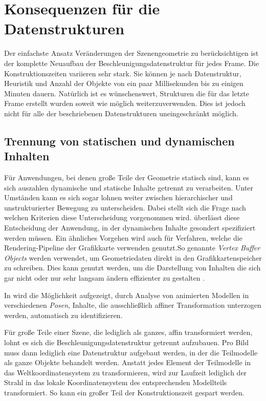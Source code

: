 \section{Konsequenzen für die Datenstrukturen}

Der einfachste Ansatz Veränderungen der Szenengeometrie zu berücksichtigen ist der komplette Neuaufbau der Beschleunigungsdatenstruktur für jedes Frame. Die Konstruktionszeiten variieren sehr stark. Sie können je nach Datenstruktur, Heuristik und Anzahl der Objekte von ein paar Millisekunden bis zu einigen Minuten dauern.
Natürlich ist es wünschenswert, Strukturen die für das letzte Frame erstellt wurden soweit wie möglich weiterzuverwenden. Dies ist jedoch nicht für alle der beschriebenen Datenstrukturen uneingeschränkt möglich.


\subsection{Trennung von statischen und dynamischen Inhalten}

Für Anwendungen, bei denen große Teile der Geometrie statisch sind, kann es sich auszahlen dynamische und statische Inhalte getrennt zu verarbeiten. Unter Umständen kann es sich sogar lohnen weiter zwischen hierarchischer und unstrukturierter Bewegung zu unterscheiden.
Dabei stellt sich die Frage nach welchen Kriterien diese Unterscheidung vorgenommen wird. \cite{Wald04} überlässt diese Entscheidung der Anwendung, in der dynamischen Inhalte gesondert spezifiziert werden müssen.
Ein ähnliches Vorgehen wird auch für Verfahren, welche die Rendering-Pipeline der Grafikkarte verwenden genutzt.So genannte  \textit{Vertex Buffer Objects} werden verwendet, um Geometriedaten direkt in den Grafikkartenspeicher zu schreiben. Dies kann genutzt werden, um die Darstellung von Inhalten die sich gar nicht oder nur sehr langsam ändern effizienter zu gestalten \cite{NVIDIA03}.

In \cite{GU06} wird die Möglichkeit aufgezeigt, durch Analyse von animierten Modellen in verschiedenen \textit{Posen}, Inhalte, die ausschließlich affiner Transformation unterzogen werden, automatisch zu identifizieren.

Für große Teile einer Szene, die lediglich als ganzes, affin transformiert werden, lohnt es sich die Beschleunigungsdatenstruktur getrennt aufzubauen. Pro Bild muss dann lediglich eine Datenstruktur aufgebaut werden, in der die Teilmodelle als ganze Objekte behandelt werden. Anstatt jedes Element der Teilmodelle in das Weltkoordinatensystem zu transformieren, wird zur Laufzeit lediglich der Strahl in das lokale Koordinatensystem des entsprechenden Modellteils transformiert. So kann ein großer Teil der Konstruktionszeit gespart werden.

